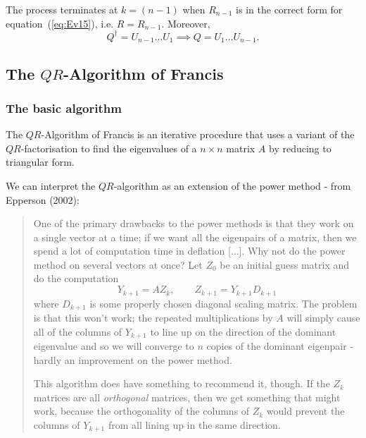 The process terminates at $k=(n-1)$ when $R_{n-1}$ is in the correct
form for equation~(\ref{eq:Ev15}), i.e. $R= R_{n-1}$.  Moreover,
% 
\begin{equation*}
  Q^{\dagger} = U_{n-1} \ldots U_{1} \implies
  Q = U_1 \ldots U_{n-1} .
\end{equation*}

\subsection{The \texorpdfstring{$QR$}{QR}-Algorithm of Francis}

\subsubsection{The basic algorithm}

The $QR$-Algorithm of Francis is an iterative procedure that uses a
variant of the $QR$-factorisation to find the eigenvalues of a $n
\times n$ matrix $A$ by reducing to triangular form.

We can interpret the $QR$-algorithm as an extension of the power
method - from Epperson (2002):%

\begin{quote}
  One of the primary drawbacks to the power methods is that they work
  on a single vector at a time; if we want all the eigenpairs of a
  matrix, then we spend a lot of computation time in deflation [...].
  Why not do the power method on several vectors at once?  Let $Z_0$
  be an initial guess matrix and do the computation
  \begin{equation*}
    Y_{k+1} = A Z_k, \qquad Z_{k+1} = Y_{k+1} D_{k+1}
  \end{equation*}
  where $D_{k+1}$ is some properly chosen diagonal scaling matrix.
  The problem is that this won't work; the repeated multiplications by
  $A$ will simply cause all of the columns of $Y_{k+1}$ to line up on
  the direction of the dominant eigenvalue and so we will converge to
  $n$ copies of the dominant eigenpair - hardly an improvement on the
  power method.

  This algorithm does have something to recommend it, though.  If the
  $Z_k$ matrices are all \textit{orthogonal} matrices, then we get
  something that might work, because the orthogonality of the columns
  of $Z_k$ would prevent the columns of $Y_{k+1}$ from all lining up
  in the same direction.
\end{quote}

